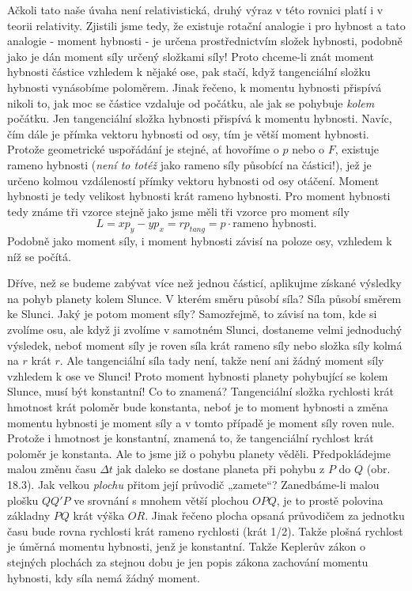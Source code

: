     Ačkoli tato naše úvaha není relativistická, druhý výraz v této rovnici platí i v teorii
    relativity. Zjistili jsme tedy, že existuje rotační analogie i pro hybnost a tato analogie -
    moment hybnosti - je určena prostřednictvím složek hybnosti, podobně jako je dán moment síly
    určený složkami síly! Proto chceme-li znát moment hybnosti částice vzhledem k nějaké ose, pak
    stačí, když tangenciální složku hybnosti vynásobíme poloměrem.  Jinak řečeno, k momentu hybnosti
    přispívá nikoli to, jak moc se částice vzdaluje od počátku, ale jak se pohybuje \emph{kolem}
    počátku. Jen tangenciální složka hybnosti přispívá k momentu hybnosti. Navíc, čím dále je přímka
    vektoru hybnosti od osy, tím je větší moment hybnosti. Protože geometrické uspořádání je stejné,
    ať hovoříme o \(p\) nebo o \(F\), existuje rameno hybnosti (\emph{není to totéž} jako rameno
    síly působící na částici!), jež je určeno kolmou vzdáleností přímky vektoru hybnosti od osy
    otáčení. Moment hybnosti je tedy velikost hybnosti krát rameno hybnosti. Pro moment hybnosti
    tedy známe tři vzorce stejně jako jsme měli tři vzorce pro moment síly
    \begin{equation}\label{fyz:eq665}
      L=xp_y−yp_x = rp_{tang} = p\cdot\text{rameno hybnosti}.
    \end{equation}
    Podobně jako moment síly, i moment hybnosti závisí na poloze osy, vzhledem k níž se počítá.

    Dříve, než se budeme zabývat více než jednou částicí, aplikujme získané výsledky na pohyb
    planety kolem Slunce. V kterém směru působí síla? Síla působí směrem ke Slunci. Jaký je potom
    moment síly? Samozřejmě, to závisí na tom, kde si zvolíme osu, ale když ji zvolíme v samotném
    Slunci, dostaneme velmi jednoduchý výsledek, neboť moment síly je roven síla krát rameno síly
    nebo složka síly kolmá na \(r\) krát \(r\). Ale tangenciální síla tady není, takže není ani
    žádný moment síly vzhledem k ose ve Slunci! Proto moment hybnosti planety pohybující se kolem
    Slunce, musí být konstantní! Co to znamená? Tangenciální složka rychlosti krát hmotnost krát
    poloměr bude konstanta, neboť je to moment hybnosti a změna momentu hybnosti je moment síly a v
    tomto případě je moment síly roven nule. Protože i hmotnost je konstantní, znamená to, že
    tangenciální rychlost krát poloměr je konstanta. Ale to jsme již o pohybu planety věděli.
    Předpokládejme malou změnu času \(\Delta t\) jak daleko se dostane planeta při pohybu z \(P\) do
    \(Q\) (obr. 18.3). Jak velkou \emph{plochu} přitom její průvodič „zamete“? Zanedbáme-li malou
    plošku \(QQ'P\) ve srovnání s mnohem větší plochou \(OPQ\), je to prostě polovina základny
    \(PQ\) krát výška \(OR\). Jinak řečeno plocha opsaná průvodičem za jednotku času bude rovna
    rychlosti krát rameno rychlosti (krát 1/2). Takže plošná rychlost je úměrná momentu hybnosti,
    jenž je konstantní. Takže Keplerův zákon o stejných plochách za stejnou dobu je jen popis zákona
    zachování momentu hybnosti, kdy síla nemá žádný moment.

